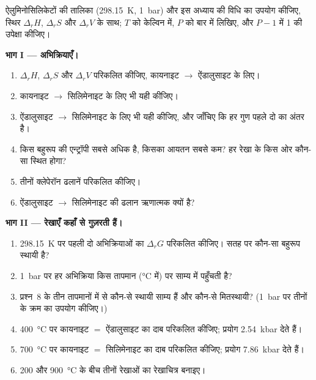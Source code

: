 \begin{problem}[{सप्ताहांत समस्या --- तालिकाओं से ऐलुमिनोसिलिकेट आरेख, और उस पर कितना
भरोसा किया जाए}]
\label{pb:b2:metamorphic-facies:1}
ऐलुमिनोसिलिकेटों की तालिका (\qty{298.15}{K}, \qty{1}{bar}) और इस अध्याय की विधि का
उपयोग कीजिए, स्थिर $\Delta_r H$, $\Delta_r S$ और $\Delta_r V$ के साथ; $T$ को
केल्विन में, $P$ को बार में लिखिए, और $P - 1$ में 1 की उपेक्षा कीजिए।

\noindent\textbf{भाग I --- अभिक्रियाएँ।}
\begin{enumerate}
\item $\Delta_r H$, $\Delta_r S$ और $\Delta_r V$ परिकलित कीजिए, कायनाइट $\to$ ऐंडालुसाइट के लिए।
\item कायनाइट $\to$ सिलिमेनाइट के लिए भी यही कीजिए।
\item ऐंडालुसाइट $\to$ सिलिमेनाइट के लिए भी यही कीजिए, और जाँचिए कि हर गुण
पहले दो का अंतर है।
\item किस बहुरूप की एन्ट्रॉपी सबसे अधिक है, किसका आयतन सबसे कम? हर रेखा के किस ओर
कौन-सा स्थित होगा?
\item तीनों क्लेपेरॉन ढलानें परिकलित कीजिए।
\item ऐंडालुसाइट $\to$ सिलिमेनाइट की ढलान ऋणात्मक क्यों है?
\end{enumerate}

\noindent\textbf{भाग II --- रेखाएँ कहाँ से गुज़रती हैं।}
\begin{enumerate}[resume]
\item \qty{298.15}{K} पर पहली दो अभिक्रियाओं का $\Delta_r G$ परिकलित कीजिए। सतह पर कौन-सा
बहुरूप स्थायी है?
\item \qty{1}{bar} पर हर अभिक्रिया किस तापमान (\unit{\celsius} में) पर
साम्य में पहुँचती है?
\item प्रश्न~8 के तीन तापमानों में से कौन-से स्थायी साम्य हैं और कौन-से
मितस्थायी? (\qty{1}{bar} पर तीनों के क्रम का उपयोग कीजिए।)
\item \qty{400}{\celsius} पर कायनाइट $=$ ऐंडालुसाइट का दाब परिकलित कीजिए;
प्रयोग \qty{2.54}{kbar} देते हैं।
\item \qty{700}{\celsius} पर कायनाइट $=$ सिलिमेनाइट का दाब परिकलित कीजिए;
प्रयोग \qty{7.86}{kbar} देते हैं।
\item 200 और \qty{900}{\celsius} के बीच तीनों रेखाओं का रेखाचित्र बनाइए।
\end{enumerate}


\end{problem}
